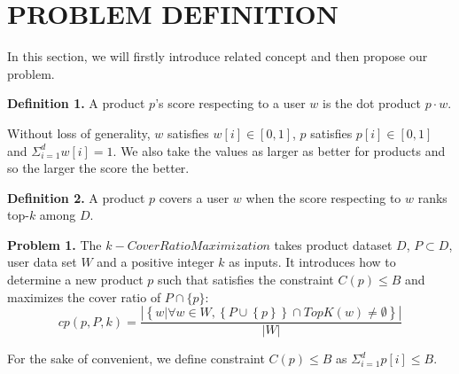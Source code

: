 \chapter{PROBLEM DEFINITION}
\label{chap:chap-two}

In this section, we will firstly introduce related concept and then propose our 
problem.  

{\bfseries Definition 1.} A product $p$'s score respecting to a user $w$ is the 
dot product $p\cdot w$.

Without loss of generality, $w$ satisfies $w[i]\in [0, 1]$, $p$ satisfies 
$p[i]\in [0, 1]$ and $\Sigma_{i=1}^d w[i]=1$. We also take the values as larger
as better for products and so the larger the score the better.

{\bfseries Definition 2.} A product $p$ covers a user $w$ when the score 
respecting to $w$ ranks top-$k$ among $D$.

{\bfseries Problem 1.} The $k-Cover Ratio Maximization$ takes product dataset 
$D$, $P\subset D$, user data set $W$ and a positive integer $k$ as inputs. 
It introduces how to determine a new product $p$ such that satisfies the 
constraint $C(p)\leq B$ and maximizes the cover ratio of $P\cap \{p\}$:  
\begin{displaymath}
  cp(p, P, k)=\frac{|\left\{w|\forall w\in W, \left\{P\cup\left\{p \right\}\right\}\cap TopK(w)\neq \emptyset  \right\}|}{|W|}  
\end{displaymath}

For the sake of convenient, we define constraint $C(p)\leq B$ as $\Sigma_{i=1}^d p[i] \leq B$.
